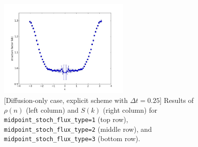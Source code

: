 \documentclass{article}
\begin{document}
\begin{figure}
\includegraphics[width=0.5\linewidth,height=1.9in]{fig1/appendix_exp_diff_dt0.25_Sk_mid3.jpg}
\caption{\label{fig_appendix_exp_diff_dt0.25_mid_type}[Diffusion-only case, explicit scheme with $\Delta t=0.25$] Results of $\rho(n)$ (left column) and $S(k)$ (right column) for \texttt{midpoint\_stoch\_flux\_type=1} (top row), \texttt{midpoint\_stoch\_flux\_type=2} (middle row), and \texttt{midpoint\_stoch\_flux\_type=3} (bottom row).
}
\end{figure}
\end{document}
